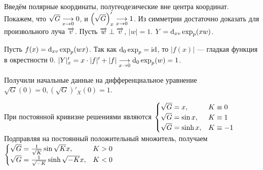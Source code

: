 \documentclass[a4paper]{report}
\begin{document}
    Введём полярные координаты, полугеодезические вне центра координат.
    Покажем, что $\sqrt{G} \underset{x \to 0}{\longrightarrow} 0$, и $\left(\sqrt{G}\right)'_{x} \underset{x \to 0}{\longrightarrow} 1$.
    Из симметрии достаточно доказать для произвольного луча $\overrightarrow{v}$.
    Пусть $\overrightarrow{w} \perp \overrightarrow{v}$, $|w| = 1$.
    $Y = \operatorname{d}\!_{xv} \exp_{p}(xw)$.

    Пусть $f(x) = \operatorname{d}\!_{xv}\exp_p(wx)$.
    Так как $\operatorname{d}\!_0 \exp_p = \operatorname{id}$, то $|f(x)|$ --- гладкая функция в окрестности $0$.
    $|Y|'_{x} = x \cdot |f|' + |f| \underset{x \to 0}{\longrightarrow} \operatorname{d}\!_0\exp_p(w) = 1$.

    Получили начальные данные на дифференциальное уравнение $\sqrt{G}(0) = 0, (\sqrt{G})'_X(0) = 1$.

    При постоянной кривизне решениями являются $\begin{cases}\sqrt{G} = x, & K \equiv 0 \\ \sqrt{G} = \sin x, & K \equiv 1 \\ \sqrt{G} = \sinh x, & K \equiv -1\end{cases}$
    Подправляя на постоянный положительный множитель, получаем $\begin{cases}\sqrt{G} = \frac{1}{\sqrt{K}}\sin\sqrt{K} x, & K > 0  \\ \sqrt{G} = \frac{1}{\sqrt{-K}}\sinh \sqrt{-K}x, & K < 0\end{cases}$
\end{document}
